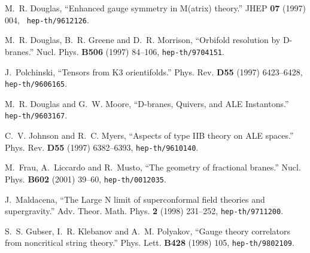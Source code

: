 \documentclass[a4paper,11pt]{article}
\begin{document}

\vspace{1ex}


\providecommand{\href}[2]{#2}\begingroup\raggedright\begin{thebibliography}{10}

M.~R. Douglas, ``Enhanced gauge symmetry in {M(atrix)} theory.'' JHEP {\bf 07}
  (1997) 004, \href{http://xxx.lanl.gov/abs/hep-th/9612126}{{\tt
  hep-th/9612126}}. %

M.~R. Douglas, B.~R. Greene and D.~R. Morrison, ``Orbifold resolution by
  D-branes.'' Nucl. Phys. {\bf B506} (1997) 84--106,
  \href{http://xxx.lanl.gov/abs/hep-th/9704151}{{\tt hep-th/9704151}}.

J.~Polchinski, ``Tensors from {K3} orientifolds.'' Phys. Rev. {\bf D55} (1997)
  6423--6428,
  \href{http://xxx.lanl.gov/abs/http://arXiv.org/abs/hep-th/9606165}{{\tt
  hep-th/9606165}}. %

M.~R. Douglas and G.~W. Moore, ``D-branes, Quivers, and ALE Instantons.''
  \href{http://xxx.lanl.gov/abs/hep-th/9603167}{{\tt hep-th/9603167}}.

C.~V. Johnson and R.~C. Myers, ``Aspects of type {IIB} theory on {ALE}
  spaces.'' Phys. Rev. {\bf D55} (1997) 6382--6393,
  \href{http://xxx.lanl.gov/abs/hep-th/9610140}{{\tt hep-th/9610140}}.

M.~Frau, A.~Liccardo and R.~Musto, ``The geometry of fractional branes.'' Nucl.
  Phys. {\bf B602} (2001) 39--60,
  \href{http://xxx.lanl.gov/abs/hep-th/0012035}{{\tt hep-th/0012035}}.

J.~Maldacena, ``The Large {N} limit of superconformal field theories and
  supergravity.'' Adv. Theor. Math. Phys. {\bf 2} (1998) 231--252,
  \href{http://xxx.lanl.gov/abs/hep-th/9711200}{{\tt hep-th/9711200}}.

S.~S. Gubser, I.~R. Klebanov and A.~M. Polyakov, ``Gauge theory correlators
  from noncritical string theory.'' Phys. Lett. {\bf B428} (1998) 105,
  \href{http://xxx.lanl.gov/abs/hep-th/9802109}{{\tt hep-th/9802109}}.


\end{thebibliography}
\end{document}
